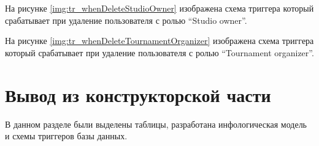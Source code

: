 
На рисунке \ref{img:tr_whenDeleteStudioOwner} изображена схема триггера который срабатывает при удаление пользователя с ролью \textquotedblleft Studio owner\textquotedblright.


На рисунке \ref{img:tr_whenDeleteTournamentOrganizer} изображена схема триггера который срабатывает при удаление пользователя с ролью \textquotedblleft Tournament organizer\textquotedblright.


\section*{Вывод из конструкторской части}
В данном разделе были выделены таблицы, разработана инфологическая модель и  схемы триггеров базы данных.